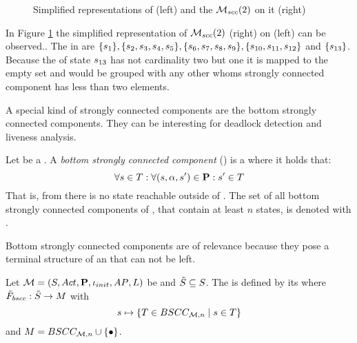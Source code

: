\documentclass[preview]{standalone}
\begin{document}
\begin{figure}[!htb]
	\begin{minipage}{.55\textwidth}
		\hspace{5mm}
		
	\end{minipage}
	\begin{minipage}{.5\textwidth}
		
	\end{minipage}
		\caption{Simplified representations of \mdp (left) and the \viewN ${{{{{\mathcal{M}}}}_{{scc}}}}(2)$ on it (right)}
		\label{fig:sccMin2} 
\end{figure}

\begin{exmp}
	\sloppy In Figure \ref{fig:sccMin2} the simplified representation of ${{{{{\mathcal{M}}}}_{{scc}}}}(2)$ (right) on \chgph (left) can be observed.. The \sccsN in \chgph are $\{{s}_1\}, \{{s}_2, {s}_3, {s}_4, {s}_5\}, \{{s}_6, {s}_7, {s}_8, {s}_9\}, \{{s}_{10}, {s}_{11}, {s}_{12}\}$ and $\{{s}_{13}\}$. Because the \sccN of state ${s}_{13}$ has not cardinality two but one it is mapped to the empty set and would be grouped with any other \state whoms strongly connected component has less than two elements.
\end{exmp}

\noindent A special kind of strongly connected components are the bottom strongly connected components. They can be interesting for deadlock detection and liveness analysis.

\begin{definition}
	Let \scc be a \sccN. A \emph{bottom strongly connected component} (\bsccN) is a \sccN where it holds that:
	\[
	\forall {s} \in {T} : \forall ({s}, {\alpha}, {s}') \in {\ensuremath{{\textbf{P}}}} : {s}' \in {T}
	\]
	That is, from \scc there is no state reachable outside of \scc. The set of all bottom strongly connected components of \chgph, that contain at least $n$ states, is denoted with \setbscc.
\end{definition}

\noindent Bottom strongly connected components are of relevance because they pose a terminal structure of an \chgph that can not be left.

\begin{definition}
	Let ${{{\mathcal{M}}}} = {{({S}, {Act}, {\textbf{P}}, {\iota_{init}}, {AP}, {L})}}$ be \achgphN and ${\tilde{{S}}} \subseteq {S}$. The \viewN \viewbscc is defined by its \grpfctN \gfctbscc where ${{\tilde{F}_{{bscc}}}} : {\tilde{{S}}} \to {\ensuremath{{M}}}$ with
	\[
	{s} \mapsto \{{T} \in {BSCC_{\ensuremath{{{{\mathcal{M}}}}},n}} \mid {s} \in {T}\}
	\]
	and $\imggrp = \setbscc \cup \remset$.
\end{definition}
\end{document}
